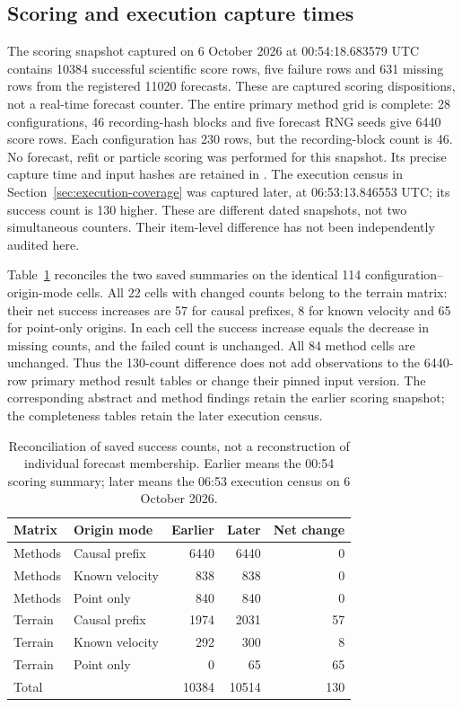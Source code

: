 \documentclass[11pt]{article}
\begin{document}
\subsection{Scoring and execution capture times}
\label{sec:score-execution-snapshots}
The scoring snapshot captured on 6 October 2026 at 00:54:18.683579 UTC
contains 10384 successful scientific
score rows, five failure rows and 631 missing rows from the registered 11020
forecasts. These are captured scoring dispositions, not a real-time forecast
counter. The entire primary method grid is complete: 28 configurations,
46 recording-hash blocks and five forecast RNG seeds give 6440 score rows.
Each configuration has 230 rows, but the recording-block count is 46.
No forecast, refit or particle scoring was performed for this snapshot.
Its precise capture time and input hashes are retained in
.
The execution census in Section~\ref{sec:execution-coverage} was captured
later, at 06:53:13.846553 UTC; its success count is 130 higher.
These are different dated snapshots, not two simultaneous counters.
Their item-level difference has not been independently audited here.

Table~\ref{tab:capture-count-difference} reconciles the two saved summaries
on the identical 114 configuration--origin-mode cells. All 22 cells with
changed counts belong to the terrain matrix: their net success increases
are 57 for causal prefixes, 8 for known velocity and 65 for point-only
origins. In each cell the success increase equals the decrease in missing
counts, and the failed count is unchanged. All 84 method cells are
unchanged. Thus the 130-count difference does not add observations to the
6440-row primary method result tables or change their pinned input version.
The corresponding abstract and method findings retain the earlier scoring
snapshot; the completeness tables retain the later execution census.

\begin{table}[htbp]
\centering\small
\caption{Reconciliation of saved success counts, not a reconstruction of
individual forecast membership. Earlier means the 00:54 scoring summary;
later means the 06:53 execution census on 6 October 2026.}
\label{tab:capture-count-difference}
\begin{tabular}{@{}llrrr@{}}
\toprule
Matrix & Origin mode & Earlier & Later & Net change\\
\midrule
Methods & Causal prefix & 6440 & 6440 & 0\\
Methods & Known velocity & 838 & 838 & 0\\
Methods & Point only & 840 & 840 & 0\\
Terrain & Causal prefix & 1974 & 2031 & 57\\
Terrain & Known velocity & 292 & 300 & 8\\
Terrain & Point only & 0 & 65 & 65\\
\midrule
Total & & 10384 & 10514 & 130\\
\bottomrule
\end{tabular}
\end{table}
\end{document}
